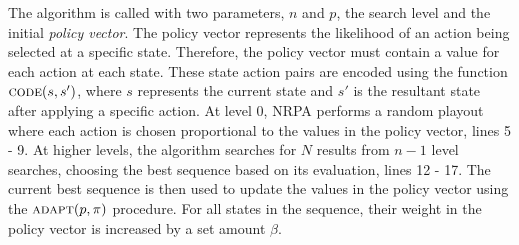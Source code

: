 \documentclass[master.tex]{subfiles}
\begin{document}
The algorithm is called with two parameters, $n$ and $p$, the search level and the initial \emph{policy vector}. The policy vector represents the likelihood of an action being selected at a specific state. Therefore, the policy vector must contain a value for each action at each state. These state action pairs are encoded using the function $\textsc{code}(s, s')$, where $s$ represents the current state and $s'$ is the resultant state after applying a specific action.  At level 0, NRPA performs a random playout where each action is chosen proportional to the values in the policy vector, lines 5 - 9. At higher levels, the algorithm searches for $N$ results from $n - 1$ level searches, choosing the best sequence based on its evaluation, lines 12 - 17. The current best sequence is then used to update the values in the policy vector using the $\textsc{adapt}(p, \pi)$ procedure. For all states in the sequence, their weight in the policy vector is increased by a set amount $\beta$. 
\end{document}
